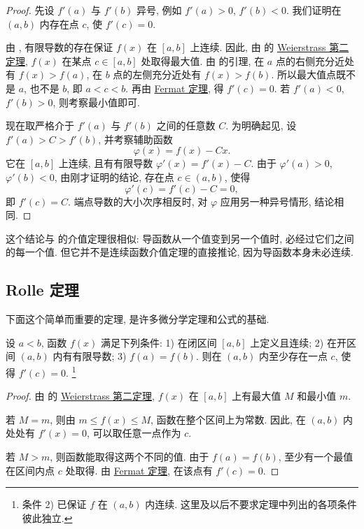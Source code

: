 \begin{proof}
先设 $f'(a)$ 与 $f'(b)$ 异号, 例如 $f'(a)>0$, $f'(b)<0$.
我们证明在 $(a,b)$ 内存在点 $c$, 使 $f'(c)=0$.

由 , 有限导数的存在保证 $f(x)$ 在 $[a,b]$ 上连续.
因此, 由  的
\hyperref[thm:weierstrass_extrema]{Weierstrass 第二定理}, $f(x)$ 在某点 $c\in[a,b]$ 处取得最大值.
由  的引理, 在 $a$ 点的右侧充分近处有 $f(x)>f(a)$,
在 $b$ 点的左侧充分近处有 $f(x)>f(b)$.
所以最大值点既不是 $a$, 也不是 $b$, 即 $a<c<b$.
再由 \hyperref[thm:fermat_stationary_point]{Fermat 定理}, 得 $f'(c)=0$.
若 $f'(a)<0$, $f'(b)>0$, 则考察最小值即可.

现在取严格介于 $f'(a)$ 与 $f'(b)$ 之间的任意数 $C$.
为明确起见, 设 $f'(a)>C>f'(b)$, 并考察辅助函数
$$
\varphi(x)=f(x)-Cx.
$$
它在 $[a,b]$ 上连续, 且有有限导数 $\varphi'(x)=f'(x)-C$.
由于 $\varphi'(a)>0$, $\varphi'(b)<0$, 由刚才证明的结论,
存在点 $c\in(a,b)$, 使得
$$
\varphi'(c)=f'(c)-C=0,
$$
即 $f'(c)=C$.
端点导数的大小次序相反时, 对 $\varphi$ 应用另一种异号情形, 结论相同.
\end{proof}

这个结论与  的介值定理很相似:
导函数从一个值变到另一个值时, 必经过它们之间的每一个值.
但它并不是连续函数介值定理的直接推论, 因为导函数本身未必连续.

\subsection{Rolle 定理}\label{subsec:111}
下面这个简单而重要的定理, 是许多微分学定理和公式的基础.

\begin{theorem}[Rolle]\label{thm:rolle}
设 $a<b$, 函数 $f(x)$ 满足下列条件:
1) 在闭区间 $[a,b]$ 上定义且连续;
2) 在开区间 $(a,b)$ 内有有限导数;
3) $f(a)=f(b)$.
则在 $(a,b)$ 内至少存在一点 $c$, 使得 $f'(c)=0$.
\footnote{条件 2) 已保证 $f$ 在 $(a,b)$ 内连续.
这里及以后不要求定理中列出的各项条件彼此独立.}
\end{theorem}

\begin{proof}
由  的
\hyperref[thm:weierstrass_extrema]{Weierstrass 第二定理},
$f(x)$ 在 $[a,b]$ 上有最大值 $M$ 和最小值 $m$.

若 $M=m$, 则由 $m\leq f(x)\leq M$, 函数在整个区间上为常数.
因此, 在 $(a,b)$ 内处处有 $f'(x)=0$, 可以取任意一点作为 $c$.

若 $M>m$, 则函数能取得这两个不同的值.
由于 $f(a)=f(b)$, 至少有一个最值在区间内点 $c$ 处取得.
由 \hyperref[thm:fermat_stationary_point]{Fermat 定理}, 在该点有 $f'(c)=0$.
\end{proof}

